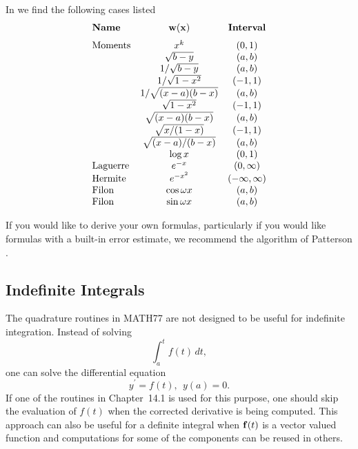 \documentclass[twoside]{MATH77}
\begin{document}
In \cite{ams55:integ-formulas} we find the following cases listed
\begin{equation*}
\begin{array}{lcc}
\text{\bf Name} & {\bf w(x)} & \text{\bf Interval}\rule[-10pt]{0pt}{15pt}\\
\text{Moments} & x^k & (0, 1) \\
 &    \sqrt{b-y} & (a, b) \\
 &  1 / \sqrt{b-y} & (a, b) \\
 &  1 / \sqrt{1-x^2} & (-1, 1) \\
 &  1 / \sqrt{(x-a)(b-x)} & (a, b) \\
 &  \sqrt{1-x^2} & (-1, 1) \\
 & \sqrt{(x-a)(b-x)} & (a, b) \\
 & \sqrt{x / (1-x)} & (-1, 1) \\
 & \sqrt{(x-a) / (b-x)} & (a, b) \\
 & \log x & (0, 1) \\
\text{Laguerre} & e^{-x} & (0, \infty) \\
\text{Hermite} & e^{-x^2} & (-\infty, \infty) \\
\text{Filon} & \cos \omega x & (a, b) \\
\text{Filon} & \sin \omega x & (a, b)
\end{array}
\end{equation*}

If you would like to derive your own formulas, particularly if you
would like formulas with a built-in error estimate, we recommend the
algorithm of Patterson \cite{Patterson:1989:AGIb}.

\subsection{Indefinite Integrals}\label{indefinite}

The quadrature routines in MATH77 are not designed to be useful for
indefinite integration.  Instead of solving
\begin{equation*}
\int_a^t f(t)\,dt,
\end{equation*}
one can solve the differential equation
\begin{equation*}
y^\prime = f(t),\ \ y(a) = 0.
\end{equation*}
If one of the routines in Chapter~14.1 is used for this purpose, one
should skip the evaluation of $f(t)$ when the corrected derivative is
being computed.  This approach can also be useful for a definite integral
when ${\bf f}(t)$ is a vector valued function and computations for some of
the components can be reused in others.
\end{document}
